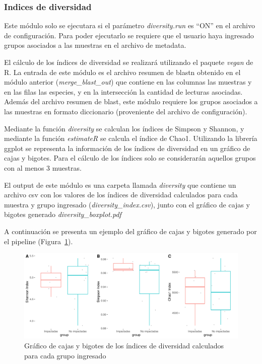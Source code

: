 \subsubsection{Indices de diversidad}
Este módulo solo se ejecutara si el parámetro \textit{diversity.run} es ``ON'' en el archivo de configuración. 
Para poder ejecutarlo se requiere que el usuario haya ingresado grupos asociados a las muestras en el archivo de metadata.

El cálculo de los índices de diversidad se realizará utilizando el paquete \textit{vegan} de R.
La entrada de este módulo es el archivo resumen de blastn obtenido en el módulo anterior (\textit{merge\_blast\_out}) que contiene en las columnas las muestras y en las filas las especies, y  en la intersección la cantidad de lecturas asociadas.
Además del archivo resumen de blast, este módulo requiere los grupos asociados a las muestras en formato diccionario (proveniente del archivo de configuración).

Mediante la función \textit{diversity} se calculan los índices de Simpson y Shannon, y mediante la función \textit{estimateR} se calcula el índice de Chao1.
Utilizando la librería ggplot se representa la información de los índices de diversidad en un gráfico de cajas y bigotes.
Para el cálculo de los índices solo se considerarán aquellos grupos con al menos 3 muestras.

El output de este módulo es una carpeta llamada \textit{diversity} que contiene un archivo csv con los valores de los índices de diversidad calculados para cada muestra y grupo ingresado (\textit{diversity\_index.csv}), junto con el gráfico de cajas y bigotes generado \textit{diversity\_boxplot.pdf}

A continuación se presenta un ejemplo del gráfico de cajas y bigotes generado por el pipeline (Figura~\ref{fig:pipeline-diversity_boxplot}).
\begin{figure}[H]
    \centering
    \includegraphics[width=0.9\linewidth]{images/pipeline/diversity_boxplot.pdf}
    \caption{Gráfico de cajas y bigotes de los índices de diversidad calculados para cada grupo ingresado}
    \label{fig:pipeline-diversity_boxplot}
\end{figure}

